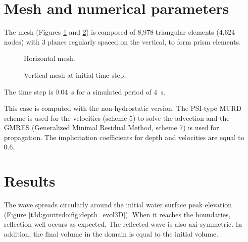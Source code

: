 \section{Mesh and numerical parameters}
\bigskip
The mesh (Figures \ref{t3d:gouttedo:fig:meshH} and \ref{t3d:gouttedo:fig:meshV})
is composed of 8,978 triangular elements (4,624 nodes) with 3 planes  
regularly spaced on the vertical, to form prism elements.

\begin{figure}[!htbp]
 \centering
 \caption{Horizontal mesh.}
 \label{t3d:gouttedo:fig:meshH}
\end{figure}
\begin{figure}[!htbp]
 \centering
 \caption{Vertical mesh at initial time step.}
 \label{t3d:gouttedo:fig:meshV}
\end{figure}
\bigskip
The time step is 0.04~s for a simulated period of 4~s. 

\bigskip
This case is computed with the non-hydrostatic version. The PSI-type MURD scheme 
is used for the velocities (scheme 5) to solve the advection and 
the GMRES (Generalized Minimal Residual Method, scheme 7) 
is used for propagation. The implicitation coefficients for depth 
and velocities are equal to 0.6.


\section{Results}
\bigskip
The wave spreads circularly around the initial water surface peak
elevation (Figure \ref{t3d:gouttedo:fig:depth_evol3D}).
When it reaches the boundaries, reflection well occurs as expected.
The reflected wave is also axi-symmetric.
In addition, the final volume in the domain is equal to the initial volume.

